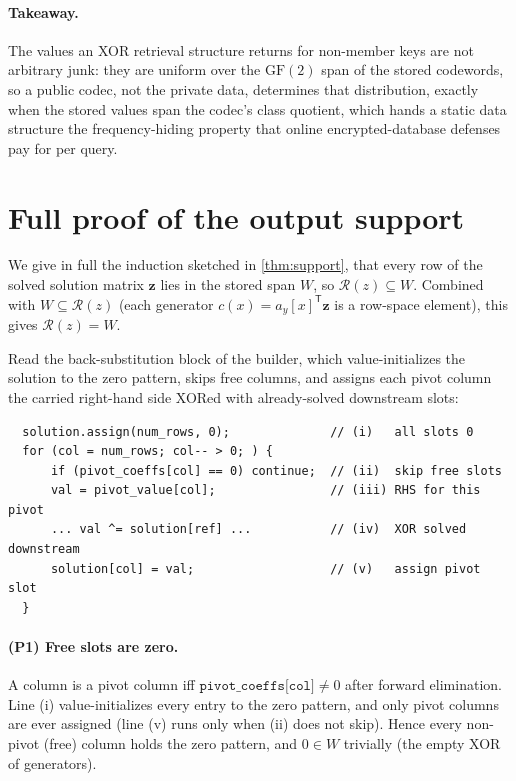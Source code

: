 \documentclass[11pt]{article}
\theoremstyle{definition}
\theoremstyle{plain}
\theoremstyle{remark}
\newcommand{\GF}{\mathrm{GF}(2)}
\newcommand{\W}{W}                          %
\newcommand{\Rz}{\mathcal{R}(z)}            %
\newcommand{\bz}{\mathbf{z}}                %
\newcommand{\ay}{a_y}                       %
\newcommand{\cx}{c(x)}                      %
\begin{document}
\paragraph{Takeaway.}
The values an XOR retrieval structure returns for non-member keys are not arbitrary junk: they are
uniform over the $\GF$ span of the stored codewords, so a public codec, not the private data,
determines that distribution, exactly when the stored values span the codec's class quotient,
which hands a static data structure the frequency-hiding property that online encrypted-database
defenses pay for per query.

\appendix

\section{Full proof of the output support}
\label{app:proofs}

We give in full the induction sketched in \cref{thm:support}, that every row of the solved
solution matrix $\bz$ lies in the stored span $\W$, so $\Rz \subseteq \W$. Combined with
$\W \subseteq \Rz$ (each generator $\cx = \ay[x]^{\mathsf T}\bz$ is a row-space element), this
gives $\Rz = \W$.

Read the back-substitution block of the builder, which value-initializes the solution to the zero
pattern, skips free columns, and assigns each pivot column the carried right-hand side XORed with
already-solved downstream slots:
\begin{verbatim}
  solution.assign(num_rows, 0);              // (i)   all slots 0
  for (col = num_rows; col-- > 0; ) {
      if (pivot_coeffs[col] == 0) continue;  // (ii)  skip free slots
      val = pivot_value[col];                // (iii) RHS for this pivot
      ... val ^= solution[ref] ...           // (iv)  XOR solved downstream
      solution[col] = val;                   // (v)   assign pivot slot
  }
\end{verbatim}

\paragraph{(P1) Free slots are zero.}
A column is a pivot column iff $\texttt{pivot\_coeffs[col]} \ne 0$ after forward elimination. Line
(i) value-initializes every entry to the zero pattern, and only pivot columns are ever assigned
(line (v) runs only when (ii) does not skip). Hence every non-pivot (free) column holds the zero
pattern, and $0 \in \W$ trivially (the empty XOR of generators).
\end{document}
